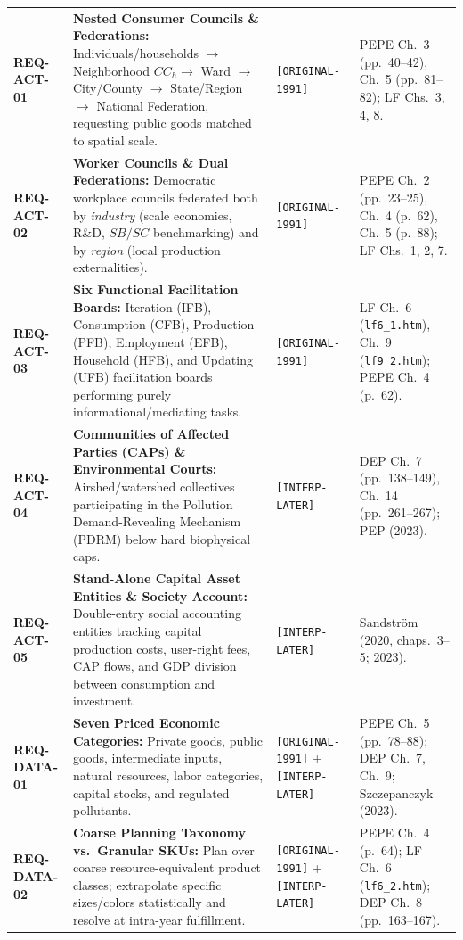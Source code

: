 \documentclass[10pt,twoside,openany]{book}
\theoremstyle{dpepstyle}
\begin{document}
{\begin{longtable}{L{0.78in} L{1.95in} L{0.82in} L{0.95in}}
\addlinespace[3pt]
\textbf{REQ-ACT-01} & \textbf{Nested Consumer Councils \& Federations:} Individuals/households $\to$ Neighborhood $CC_h \to$ Ward $\to$ City/County $\to$ State/Region $\to$ National Federation, requesting public goods matched to spatial scale. & \texttt{[ORIGINAL-1991]} & PEPE Ch.~3 (pp.~40--42), Ch.~5 (pp.~81--82); LF Chs.~3, 4, 8. \\
\addlinespace[3pt]
\textbf{REQ-ACT-02} & \textbf{Worker Councils \& Dual Federations:} Democratic workplace councils federated both by \emph{industry} (scale economies, R\&D, $SB/SC$ benchmarking) and by \emph{region} (local production externalities). & \texttt{[ORIGINAL-1991]} & PEPE Ch.~2 (pp.~23--25), Ch.~4 (p.~62), Ch.~5 (p.~88); LF Chs.~1, 2, 7. \\
\addlinespace[3pt]
\textbf{REQ-ACT-03} & \textbf{Six Functional Facilitation Boards:} Iteration (IFB), Consumption (CFB), Production (PFB), Employment (EFB), Household (HFB), and Updating (UFB) facilitation boards performing purely informational/mediating tasks. & \texttt{[ORIGINAL-1991]} & LF Ch.~6 (\texttt{lf6\_1.htm}), Ch.~9 (\texttt{lf9\_2.htm}); PEPE Ch.~4 (p.~62). \\
\addlinespace[3pt]
\textbf{REQ-ACT-04} & \textbf{Communities of Affected Parties (CAPs) \& Environmental Courts:} Airshed/watershed collectives participating in the Pollution Demand-Revealing Mechanism (PDRM) below hard biophysical caps. & \texttt{[INTERP-LATER]} & DEP Ch.~7 (pp.~138--149), Ch.~14 (pp.~261--267); PEP (2023). \\
\addlinespace[3pt]
\textbf{REQ-ACT-05} & \textbf{Stand-Alone Capital Asset Entities \& Society Account:} Double-entry social accounting entities tracking capital production costs, user-right fees, CAP flows, and GDP division between consumption and investment. & \texttt{[INTERP-LATER]} & Sandstr\"om (2020, chaps.~3--5; 2023). \\
\addlinespace[3pt]
\textbf{REQ-DATA-01} & \textbf{Seven Priced Economic Categories:} Private goods, public goods, intermediate inputs, natural resources, labor categories, capital stocks, and regulated pollutants. & \texttt{[ORIGINAL-1991]} + \texttt{[INTERP-LATER]} & PEPE Ch.~5 (pp.~78--88); DEP Ch.~7, Ch.~9; Szczepanczyk (2023). \\
\addlinespace[3pt]
\textbf{REQ-DATA-02} & \textbf{Coarse Planning Taxonomy vs.\ Granular SKUs:} Plan over coarse resource-equivalent product classes; extrapolate specific sizes/colors statistically and resolve at intra-year fulfillment. & \texttt{[ORIGINAL-1991]} + \texttt{[INTERP-LATER]} & PEPE Ch.~4 (p.~64); LF Ch.~6 (\texttt{lf6\_2.htm}); DEP Ch.~8 (pp.~163--167). \\

\end{longtable}}
\end{document}
